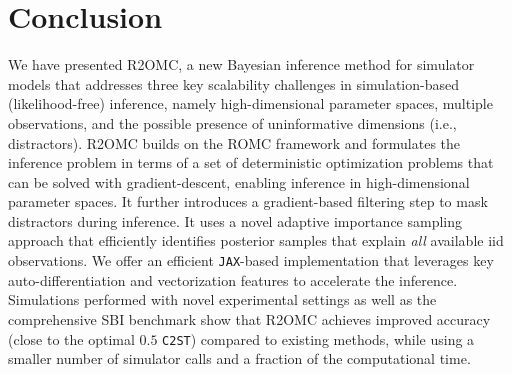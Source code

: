 \documentclass[twoside]{article}
\newcommand{\rromc}{R2OMC}
\newcommand{\CtwoST}{\texttt{C2ST}}
\begin{document}


\section{Conclusion}
\label{sec:conclusion}

We have presented \rromc, a new Bayesian inference method for simulator models that addresses three key scalability challenges in simulation-based (likelihood-free) inference, namely high-dimensional parameter spaces, multiple observations, and the possible presence of uninformative dimensions (i.e., distractors). R2OMC builds on the ROMC framework and formulates the inference problem in terms of a set of deterministic optimization problems that can be solved with gradient-descent, enabling inference in high-dimensional parameter spaces. It further introduces a gradient-based filtering step to mask distractors during inference. It uses a novel adaptive importance sampling approach that efficiently identifies posterior samples that explain \emph{all} available iid observations. We offer an efficient \texttt{JAX}-based implementation that leverages key auto-differentiation and vectorization features to accelerate the inference. Simulations performed with novel experimental settings as well as the comprehensive SBI benchmark show that R2OMC achieves improved accuracy (close to the optimal $0.5$ \texttt{C2ST}) compared to existing methods, while using a smaller number of simulator calls and a fraction of the computational time. 
\end{document}
